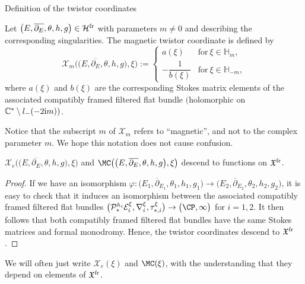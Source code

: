 \begin{subsubsection} {Definition of the twistor coordinates}
\begin{Definition} Let $\bigl(E,\overline{\partial_E},\theta,h,g\bigr)\in \mathcal{H}^{{\rm fr}}$ with parameters $m\neq 0$ and  describing the corresponding singularities. The magnetic twistor coordinate is defined by
\begin{equation*}
 \mathcal{X}_m\bigl(\bigl(E,\overline{\partial_E},\theta,h,g\bigr),\xi\bigr):=\begin{cases}
 a(\xi) & \text{for} \ \xi \in \mathbb{H}_{m}, \\
 -\dfrac{1}{b(\xi)} & \text{for} \ \xi \in \mathbb{H}_{-m},
 \end{cases}
\end{equation*}
where $a(\xi)$ and $b(\xi)$ are the corresponding Stokes matrix elements of the associated compatibly framed filtered flat bundle  $($holomorphic on $\mathbb{C}^*\setminus l_{-}(-2{\rm i}m))$.
\end{Definition}

\begin{Remark} Notice that the subscript $m$ of $\mathcal{X}_m$ refers to ``magnetic'', and not to the complex parameter $m$. We hope this notation does not cause confusion.
\end{Remark}
\begin{Lemma} $\mathcal{X}_e\bigl(\bigl(E,\overline{\partial_E},\theta,h,g\bigr),\xi\bigr)$ and $\MC\bigl(\bigl(E,\overline{\partial_E},\theta,h,g\bigr),\xi\bigr)$ descend to functions on $\mathfrak{X}^{{\rm fr}}$.

\end{Lemma}

\begin{proof}
If we have an isomorphism $\varphi\colon \bigl(E_1,\overline{\partial}_{E_1},\theta_1,h_1,g_1\bigr)\to \bigl(E_2,\overline{\partial}_{E_2},\theta_2,h_2,g_2\bigr)$, it is easy to check that it induces an isomorphism between the associated compatibly framed filtered flat bundles $\bigl(\mathcal{P}_{*}^{h_i}\mathcal{E}^{\xi}_i,\nabla^{\xi}_i, \tau_{*,i}^{\xi}\bigr)\to \bigl(\CP,\infty\bigr)$ for $i=1,2$. It then follows that both compatibly framed filtered flat bundles have the same Stokes matrices and formal monodromy. Hence, the twistor coordinates descend to $\mathfrak{X}^{{\rm fr}}$.
\end{proof}

We will often just write $\mathcal{X}_e(\xi)$ and $\MC(\xi)$, with the understanding that they depend on elements of $\mathfrak{X}^{{\rm fr}}$.


\end{subsubsection}
